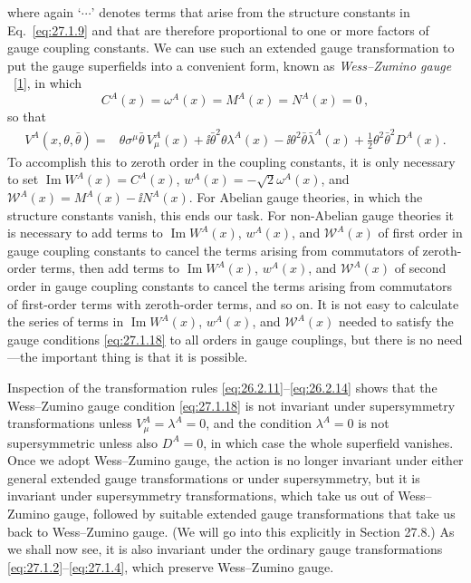 where again `\(\cdots\)' denotes terms that arise from the structure
constants in Eq.~\eqref{eq:27.1.9} and that are therefore proportional
to one or more factors of gauge coupling constants. We can use such an
extended gauge transformation to put the gauge superfields into a
convenient form, known as \textit{Wess--Zumino gauge}
~\hyperref[ch27-ref-1]{[1]}, in which
\begin{equation}
  C^A(x)=\omega^A(x)=M^A(x)=N^A(x)=0\,,
  \tag{27.1.18}\label{eq:27.1.18}
\end{equation}
so that
\begin{equation}
  \begin{aligned}
  V^A(x,\theta,\bar\theta)={}&
  \theta\sigma^\mu\bar\theta\,V^A_\mu(x)
  +\ii\bar\theta^2\theta\lambda^A(x)
  -\ii\theta^2\bar\theta\bar\lambda^A(x)
  +\frac12\theta^2\bar\theta^2D^A(x).
  \end{aligned}
  \tag{27.1.19}\label{eq:27.1.19}
\end{equation}
To accomplish this to zeroth order in the coupling constants, it is only
necessary to set \(\operatorname{Im}W^A(x)=C^A(x)\),
\(w^A(x)=-\sqrt{2}\omega^A(x)\), and
\(\mathcal{W}^A(x)=M^A(x)-\ii N^A(x)\). For Abelian gauge theories, in which
the structure constants vanish, this ends our task. For non-Abelian gauge
theories it is necessary to add terms to \(\operatorname{Im}W^A(x)\),
\(w^A(x)\), and \(\mathcal{W}^A(x)\) of first order in gauge coupling
constants to cancel the terms arising from commutators of zeroth-order
terms, then add terms to \(\operatorname{Im}W^A(x)\), \(w^A(x)\), and
\(\mathcal{W}^A(x)\) of second order in gauge coupling constants to cancel
the terms arising from commutators of first-order terms with zeroth-order
terms, and so on. It is not easy to calculate the series of terms in
\(\operatorname{Im}W^A(x)\), \(w^A(x)\), and \(\mathcal{W}^A(x)\) needed
to satisfy the gauge conditions \eqref{eq:27.1.18} to all orders in gauge
couplings, but there is no need---the important thing is that it is possible.

Inspection of the transformation rules
\eqref{eq:26.2.11}--\eqref{eq:26.2.14} shows that the Wess--Zumino gauge
condition \eqref{eq:27.1.18} is not invariant under supersymmetry
transformations unless \(V^A_\mu=\lambda^A=0\), and the condition
\(\lambda^A=0\) is not supersymmetric unless also \(D^A=0\), in which
case the whole superfield vanishes. Once we adopt Wess--Zumino gauge, the
action is no longer invariant under either general extended gauge
transformations or under supersymmetry, but it is invariant under
supersymmetry transformations, which take us out of Wess--Zumino gauge,
followed by suitable extended gauge transformations that take us back to
Wess--Zumino gauge. (We will go into this explicitly in Section 27.8.) As
we shall now see, it is also invariant under the ordinary gauge
transformations \eqref{eq:27.1.2}--\eqref{eq:27.1.4}, which preserve
Wess--Zumino gauge.

